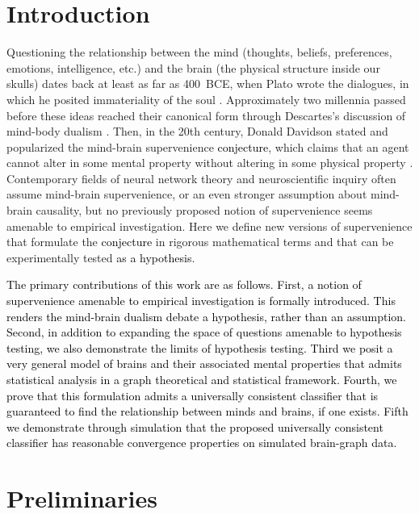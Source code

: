 \documentclass{article}
\providecommand{\tr}[1]{\textcolor{black}{#1}}
\begin{document}
\vspace*{0.5 in}


\section{Introduction}

Questioning the relationship between the mind (thoughts, beliefs, preferences, emotions, intelligence, etc.) and the brain (the physical structure inside our skulls) dates back at least as far as 400~BCE, when Plato wrote the dialogues, in which he posited immateriality of the soul \cite{Plato97}. Approximately two millennia passed before these ideas reached their canonical form through Descartes's discussion of mind-body dualism \cite{Descartes1641}. Then, in the 20th century, Donald Davidson stated and popularized the mind-brain supervenience \tr{conjecture}, which claims that an agent cannot alter in some mental property without altering in some physical property \cite{Davidson70}. Contemporary fields of neural network theory and neuroscientific inquiry often assume mind-brain supervenience, or an even stronger assumption about mind-brain causality, but no previously proposed notion of supervenience seems amenable to empirical investigation. Here we define new versions of supervenience that formulate the \tr{conjecture} in rigorous mathematical terms and that can be experimentally tested \tr{as a hypothesis}.

\tr{The primary contributions of this work are as follows.  First, a notion of supervenience amenable to empirical investigation is formally introduced.  This renders the mind-brain dualism debate a hypothesis, rather than an assumption.  Second, in addition to expanding the space of questions amenable to hypothesis testing, we also demonstrate the limits of hypothesis testing.  Third we posit a very general model of brains and their associated mental properties that admits statistical analysis in a graph theoretical and statistical framework.  Fourth, we prove that this formulation admits a universally consistent classifier that is guaranteed to find the relationship between minds and brains, if one exists.  Fifth we demonstrate through simulation that the proposed universally consistent classifier has reasonable convergence properties on simulated brain-graph data.}


\section{Preliminaries} %
\label{sec:preliminaries}
\end{document}
